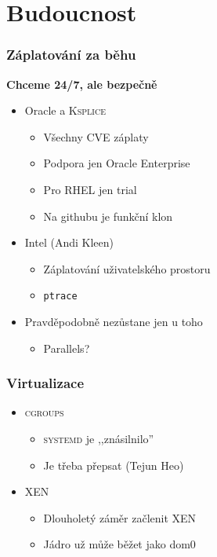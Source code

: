 \documentclass[xcolor=dvipsnames,handout]{beamer}
\newcommand{\heading}[1]{\textbf{\textcolor{BurntOrange}{#1}}}
\newcommand{\code}[2][]{\lstinline[columns=fullflexible, basicstyle=\ttfamily,
	#1]$#2$}
\begin{document}
\section{Budoucnost}
\frame{\sectionpage}

\begin{frame}
  \frametitle{Záplatování za běhu}
  
  \heading{Chceme 24/7, ale bezpečně}
  \begin{itemize}
    \item Oracle a \textsc{Ksplice}
    \begin{itemize}
      \item Všechny CVE záplaty
      \item Podpora jen Oracle Enterprise
      \item Pro RHEL jen trial
      \item Na githubu je funkční klon
    \end{itemize}

    \pause

    \item Intel (Andi Kleen)
    \begin{itemize}
      \item Záplatování uživatelského prostoru
      \item \code{ptrace}
    \end{itemize}

    \pause

    \item Pravděpodobně nezůstane jen u toho
    \begin{itemize}
      \item Parallels?
    \end{itemize}
  \end{itemize}
\end{frame}

\begin{frame}
  \frametitle{Virtualizace}

  \begin{itemize}
    \item \textsc{cgroups}
    \begin{itemize}
      \item \textsc{systemd} je ,,znásilnilo''
      \item Je třeba přepsat (Tejun Heo)
    \end{itemize}

    \pause

    \item \textsc{XEN}
    \begin{itemize}
      \item Dlouholetý záměr začlenit \textsc{XEN}
      \item Jádro už může běžet jako dom0
    \end{itemize}
  \end{itemize}

\end{frame}
\end{document}
